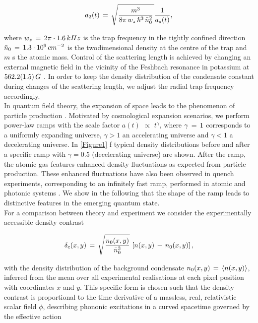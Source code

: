 \documentclass[11pt,twocolumn,letterpaper]{article}
\newcounter{ns}
\begin{document}
\begin{equation}
    \label{Eq.2}
    a_{2}(t) \thinspace = \thinspace \sqrt{\frac{m^{3}}{8 \pi \thinspace w_{z} \thinspace \hslash^{3} \thinspace \Bar{n}^{2}_{0}} \thinspace} \frac{1}{a_{s}(t)},
\end{equation}

where $w_{z} \thinspace = \thinspace 2 \pi \cdot 1.6 \thinspace kHz $  is the trap frequency in the tightly confined direction $\Bar{n}_{0} \thinspace = \thinspace 1.3 \cdot 10^{9} \thinspace cm^{-2}$ is the twodimensional density at the centre of the trap and $m$ s the atomic mass. Control of the scattering length is achieved by changing an external magnetic field in the vicinity of the Feshbach resonance in potassium at $562.2(1.5) \thinspace G$ \cite{Lb.28}. In order to keep the density distribution of the condensate constant during changes of the scattering length, we adjust the radial trap frequency accordingly.\\

In quantum field theory, the expansion of space leads to the phenomenon of particle production \cite{Lb.2, Lb.3, Lb.4}. Motivated by cosmological expansion scenarios, we perform power-law ramps with the scale factor $a(t)$ $\propto$ $t^{\gamma}$, where $\gamma \thinspace =\thinspace 1$ corresponds to a uniformly expanding universe, $\gamma > 1$  an accelerating universe and $\gamma < 1$ a decelerating universe. In \ref{Figure1} f typical density distributions before and after a specific ramp with $\gamma = 0.5$ (decelerating universe) are shown. After the ramp, the atomic gas features enhanced density fluctuations as expected from particle production. These enhanced fluctuations have also been observed in quench experiments, corresponding to an infinitely fast ramp, performed in atomic \cite{Lb.29, Lb.30} and photonic systems \cite{Lb.31}. We show in the following that the shape of the ramp leads to distinctive features in the emerging quantum state.\\

For a comparison between theory and experiment we consider the experimentally accessible density contrast

\begin{equation}
    \label{Eq.3}
    \delta_{c} (x,y) \thinspace = \thinspace \sqrt{\frac{n_{0}(x,y)}{\Bar{n}^{3}_{0}}} \thinspace \left[ n(x,y) \thinspace - \thinspace n_{0} (x,y) \right] ,
\end{equation}

with the density distribution of the background condensate $n_{0} (x,y) \thinspace = \thinspace \langle n(x,y) \rangle$, inferred from the mean over all experimental realisations at each pixel position with coordinates $x$ and $y$. This specific form is chosen such that the density contrast is proportional to the time derivative of a massless, real, relativistic scalar field $\phi$, describing phononic excitations in a curved spacetime governed by the effective action
\end{document}

